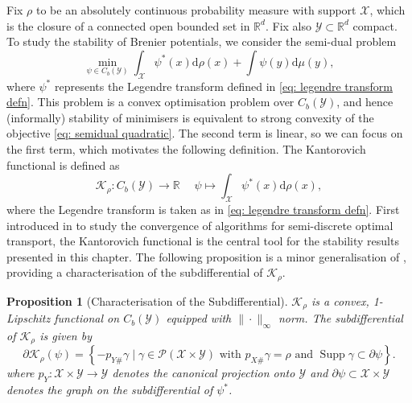 \documentclass[11pt, oneside, titlepage]{book}
\theoremstyle{plain}
\newtheorem{proposition}[theorem]{Proposition}
\theoremstyle{definition}
\newcommand{\R}{\mathbb{R}}
\newcommand{\K}{\mathcal{K}}
\newcommand{\X}{\mathcal{X}}
\newcommand{\Y}{\mathcal{Y}}
\newcommand{\di}{\mathrm{d}}
\DeclareMathOperator{\supp}{Supp}
\begin{document}
Fix $\rho$ to be an absolutely continuous probability measure with support $\X$, which is the closure of a connected open bounded set in $\R^d$. Fix also $\Y \subset \R^d$ compact. To study the stability of Brenier potentials, we consider the semi-dual problem
\begin{equation}
\label{eq: semidual quadratic}
    \min_{\psi \in C_b(\Y)} \int_\X \psi^*(x) \di \rho(x) + \int \psi(y) \di \mu(y),
\end{equation}
where $\psi^*$ represents the Legendre transform defined in \eqref{eq: legendre transform defn}.
This problem is a convex optimisation problem over $C_b(\Y)$, and hence (informally) stability of minimisers is equivalent to strong convexity of the objective \eqref{eq: semidual quadratic}. The second term is linear, so we can focus on the first term, which motivates the following definition. The Kantorovich functional is defined as
\begin{equation*}
    \K_\rho : C_b(\Y) \to \R \; \quad \psi \mapsto \int_\X \psi^*(x) \di \rho(x),
\end{equation*}
where the Legendre transform is taken as in \eqref{eq: legendre transform defn}. First introduced in \cite{kitagawa2019convergence} to study the convergence of algorithms for semi-discrete optimal transport, the Kantorovich functional is the central tool for the stability results presented in this chapter. The following proposition is a minor generalisation of \cite[Lemma 1.8]{delalandethesis}, providing a characterisation of the subdifferential of $\K_\rho$.
\begin{proposition}[Characterisation of the Subdifferential]
\label{prop: subdiff characterisation}
$\K_\rho$ is a convex, 1-Lipschitz functional on $C_b(\Y)$ equipped with $\| \cdot \|_\infty$ norm. The subdifferential of $\K_\rho$ is given by
\begin{equation}
\label{eq: K rho subdiff char by projection}
    \partial \K_\rho(\psi) = \left\{ -  p_{Y\#}\gamma \;|\;  \gamma \in \mathcal{P}(\X \times \Y) \text{ with } p_{X\#}\gamma = \rho \text{ and }\supp \gamma \subset \partial \psi \right\}.
\end{equation}
where $p_Y: \X \times \Y \to \Y$ denotes the canonical projection onto $\Y$ and
$\partial \psi\subset \X \times \Y$ denotes the graph on the subdifferential of $\psi^*$.
\end{proposition}
\end{document}
